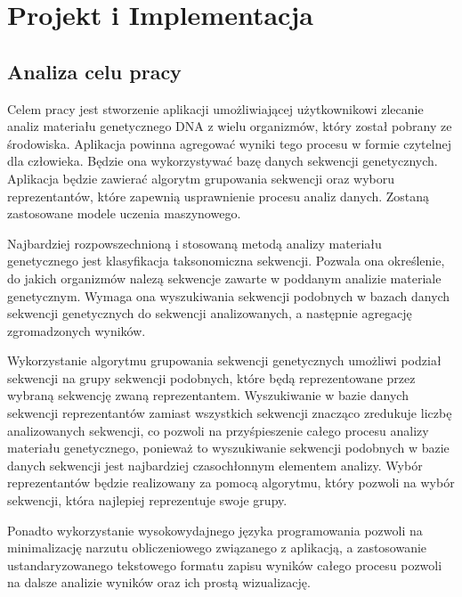 \cleardoublepage
\section{Projekt i Implementacja}

    \subsection{Analiza celu pracy}
        
        Celem pracy jest stworzenie aplikacji umożliwiającej użytkownikowi zlecanie analiz materiału genetycznego DNA z wielu organizmów, który został pobrany ze środowiska. Aplikacja powinna agregować wyniki tego procesu w formie czytelnej dla człowieka. Będzie ona wykorzystywać bazę danych sekwencji genetycznych. Aplikacja będzie zawierać algorytm grupowania sekwencji oraz wyboru reprezentantów, które zapewnią usprawnienie procesu analiz danych. Zostaną zastosowane modele uczenia maszynowego.

        Najbardziej rozpowszechnioną i stosowaną metodą analizy materiału genetycznego jest klasyfikacja taksonomiczna sekwencji. Pozwala ona określenie, do jakich organizmów nalezą sekwencje zawarte w poddanym analizie materiale genetycznym. Wymaga ona wyszukiwania sekwencji podobnych w bazach danych sekwencji genetycznych do sekwencji analizowanych, a następnie agregację zgromadzonych wyników.

        Wykorzystanie algorytmu grupowania sekwencji genetycznych umożliwi podział sekwencji na grupy sekwencji podobnych, które będą reprezentowane przez wybraną sekwencję zwaną reprezentantem. Wyszukiwanie w bazie danych sekwencji reprezentantów zamiast wszystkich sekwencji znacząco zredukuje liczbę analizowanych sekwencji, co pozwoli na przyśpieszenie całego procesu analizy materiału genetycznego, ponieważ to wyszukiwanie sekwencji podobnych w bazie danych sekwencji jest najbardziej czasochłonnym elementem analizy. Wybór reprezentantów będzie realizowany za pomocą algorytmu, który pozwoli na wybór sekwencji, która najlepiej reprezentuje swoje grupy.

        Ponadto wykorzystanie wysokowydajnego języka programowania pozwoli na minimalizację narzutu obliczeniowego związanego z aplikacją, a zastosowanie ustandaryzowanego tekstowego formatu zapisu wyników całego procesu pozwoli na dalsze analizie wyników oraz ich prostą wizualizację.

